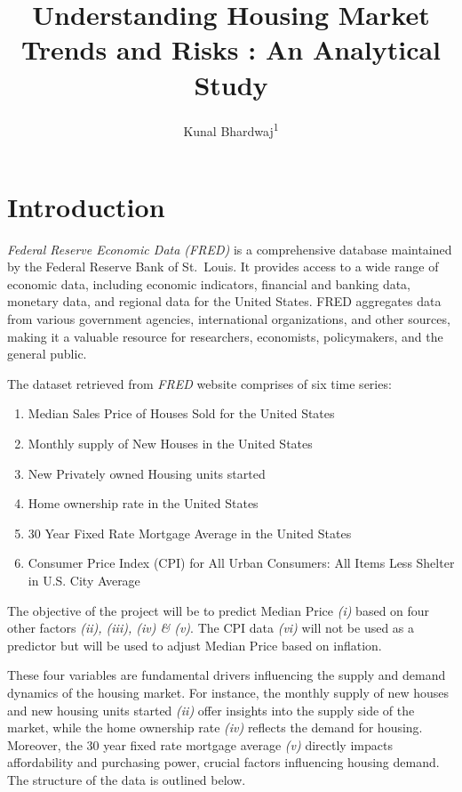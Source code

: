 \documentclass[
  man]{apa6}
\title{Understanding Housing Market Trends and Risks : An Analytical Study}
\author{Kunal Bhardwaj\textsuperscript{1}}
\date{}
\affiliation{\vspace{0.5cm}\textsuperscript{1} UIUC}
\begin{document}
\maketitle

\section{Introduction}\label{introduction}

\emph{Federal Reserve Economic Data (FRED)} is a comprehensive database maintained by the Federal Reserve Bank of St.~Louis. It provides access to a wide range of economic data, including economic indicators, financial and banking data, monetary data, and regional data for the United States. FRED aggregates data from various government agencies, international organizations, and other sources, making it a valuable resource for researchers, economists, policymakers, and the general public.

The dataset retrieved from \emph{FRED} website comprises of six time series:

\begin{enumerate}
\def\labelenumi{\roman{enumi})}
\item
  Median Sales Price of Houses Sold for the United States
\item
  Monthly supply of New Houses in the United States
\item
  New Privately owned Housing units started
\item
  Home ownership rate in the United States
\item
  30 Year Fixed Rate Mortgage Average in the United States
\item
  Consumer Price Index (CPI) for All Urban Consumers: All Items Less Shelter in U.S. City Average
\end{enumerate}

The objective of the project will be to predict Median Price \emph{(i)} based on four other factors \emph{(ii), (iii), (iv) \& (v)}. The CPI data \emph{(vi)} will not be used as a predictor but will be used to adjust Median Price based on inflation.

These four variables are fundamental drivers influencing the supply and demand dynamics of the housing market. For instance, the monthly supply of new houses and new housing units started \emph{(ii)} offer insights into the supply side of the market, while the home ownership rate \emph{(iv)} reflects the demand for housing. Moreover, the 30 year fixed rate mortgage average \emph{(v)} directly impacts affordability and purchasing power, crucial factors influencing housing demand. The structure of the data is outlined below.
\end{document}
